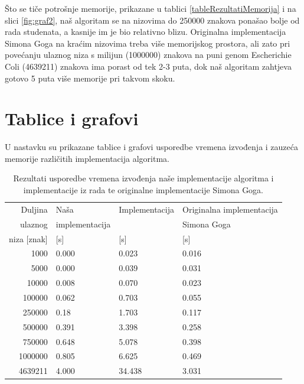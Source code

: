\documentclass[times, utf8, seminar]{fer}
\begin{document}
Što se tiče potrošnje memorije, prikazane u tablici \ref{tableRezultatiMemorija} i na slici \ref{fig:graf2}, naš algoritam se na nizovima do 250000 znakova ponašao bolje od rada studenata, a kasnije im je bio relativno blizu. Originalna implementacija Simona Goga na kraćim nizovima treba više memorijskog prostora, ali zato pri povećanju ulaznog niza s milijun (1000000) znakova na puni genom Escherichie Coli (4639211) znakova ima porast od tek 2-3 puta, dok naš algoritam zahtjeva gotovo 5 puta više memorije pri takvom skoku.

\section{Tablice i grafovi}
 U nastavku su prikazane tablice i grafovi usporedbe vremena izvođenja i zauzeća memorije različitih implementacija algoritma.
\begin{table}
\caption{Rezultati usporedbe vremena izvođenja naše implementacije algoritma i implementacije iz rada \cite{studenti2016} te originalne implementacije Simona Goga.}
\label{tableRezultatiVrijeme}
\begin{center}
\begin{tabular}{rlll}
\toprule
Duljina & Naša & Implementacija & Originalna implementacija \\
ulaznog & implementacija & \cite{studenti2016} & Simona Goga \\
niza   [znak] &  [s] &  [s] &  [s]\\
\midrule
1000 & 0.000 & 0.023 & 0.016\\
5000 & 0.000 &  0.039 & 0.031 \\
10000 & 0.008 & 0.070 & 0.023 \\
100000 & 0.062 & 0.703 & 0.055 \\
250000 & 0.18 & 1.703 & 0.117 \\
500000 & 0.391 & 3.398 & 0.258\\
750000 & 0.648 & 5.078 & 0.398\\
1000000 & 0.805 & 6.625 & 0.469 \\
4639211 & 4.000 & 34.438 & 3.031\\
\bottomrule
\end{tabular}
\end{center}
\end{table}
\end{document}
